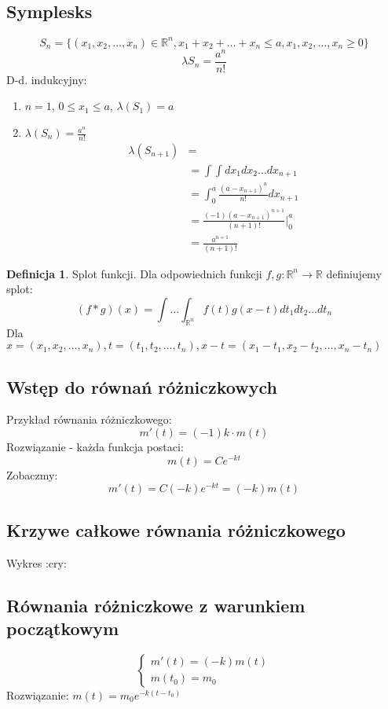 \documentclass{article}
\theoremstyle{definition}
\newtheorem{de}{Definicja}[subsection]
\theoremstyle{definition}
\theoremstyle{definition}
\theoremstyle{definition}
\begin{document}
\subsection{Symplesks}

\[S_n=\{(x_1,x_2,\dots,x_n)\in\mathbb{R}^n, x_1+x_2+\dots+x_n\leq a, x_1,x_2,\dots,x_n\geq 0\}\]
\[\lambda{S_n}=\frac{a^n}{n!}\]
D-d. indukcyjny:
\begin{enumerate}
    \item $n=1$, $0\leq x_1\leq a$, $\lambda(S_1)=a$ 
    \item $\lambda(S_n)=\frac{a^n}{n!}$
    \begin{align}
        \lambda(S_{n+1})&=\\
        &= \int\int dx_1 dx_2\dots dx_{n+1}\\
        &= \int_{0}^{a} \frac{(a-x_{n+1})^n}{n!} dx_{n+1}\\
        &= \frac{(-1)(a-x_{n+1})^{n+1}}{(n+1)!}|_{0}^{a}\\
        &= \frac{a^{n+1}}{(n+1)!}
    \end{align}
\end{enumerate}

\begin{de}
    Splot funkcji. Dla odpowiednich funkcji $f,g:\mathbb{R}^n\rightarrow \mathbb{R}$
    definiujemy splot:
    \[(f*g)(x) = \int\dots\int_{\mathbb{R}^n} f(t)g(x-t) dt_1 dt_2 \dots dt_n\]
    Dla $x=(x_1,x_2,\dots,x_n), t=(t_1,t_2,\dots,t_n), x-t=(x_1-t_1,x_2-t_2,\dots,x_n-t_n)$
\end{de}

\subsection{Wstęp do równań różniczkowych}

Przykład równania różniczkowego:
\[m'(t)=(-1)k \cdot m(t)\]
Rozwiązanie - każda funkcja postaci:
\[m(t)=Ce^{-kt}\]
Zobaczmy:
\[m'(t)=C (-k) e^{-kt} = (-k) m(t)\]

\subsection{Krzywe całkowe równania różniczkowego}

Wykres :cry:

\subsection{Równania różniczkowe z warunkiem początkowym}

$$\begin{cases}
    m'(t)=(-k)m(t)\\
    m(t_0)=m_0
\end{cases}$$
Rozwiązanie:
$m(t)=m_0 e^{-k(t-t_0)}$
\end{document}
